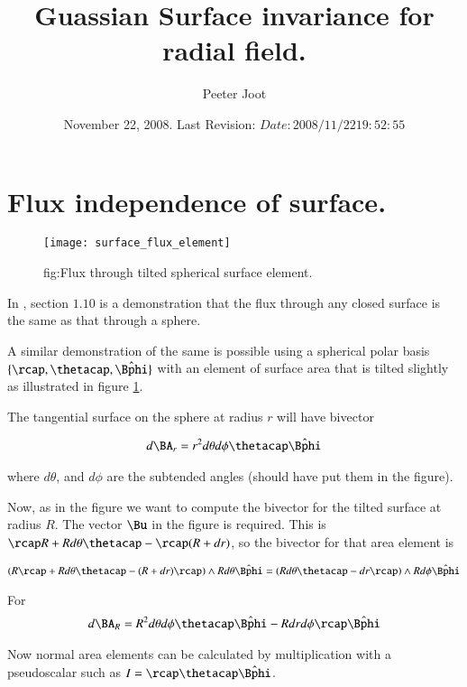 \documentclass{article}
\title{ Guassian Surface invariance for radial field. }
\author{Peeter Joot}
\date{ November 22, 2008.  Last Revision: $Date: 2008/11/22 19:52:55 $ }
\newcommand{\phicap}[0]{\hat{\Bphi}}
\begin{document}
\maketitle{}
\section{ Flux independence of surface. }

\begin{figure}[htp]
\centering
\texttt{[image: surface\_flux\_element]}
\caption{fig:Flux through tilted spherical surface element.}
\label{fig:surface_flux_element}
\end{figure}

In \cite{purcell1963eam}, section $1.10$ is a demonstration that the flux
through any closed surface is the same as that through a sphere.

A similar demonstration of the same is possible using a spherical polar basis
$\{\rcap, \thetacap, \phicap\}$ with an element of surface area that is
tilted slightly as illustrated in figure \ref{fig:surface_flux_element}.

The tangential surface on the sphere at radius $r$ will have bivector

\begin{align}
d\BA_r = r^2 d\theta d\phi \thetacap\phicap
\end{align}

where $d\theta$, and $d\phi$ are the subtended angles (should have put them in the figure).

Now, as in the figure we want to compute the bivector for the tilted surface at radius $R$.  The vector $\Bu$ in the figure is required.
This is $\rcap R + R d\theta \thetacap - \rcap(R + dr)$, so the bivector for that area element is

\begin{align*}
\left(R \rcap + R d\theta \thetacap - (R + dr) \rcap \right) \wedge {R d\theta \phicap} 
&= \left(R d\theta \thetacap - dr \rcap \right) \wedge {R d\phi \phicap} \\
\end{align*}

For
\begin{align}
d\BA_R = R^2 d\theta d\phi \thetacap \phicap - R dr d\phi \rcap \phicap
\end{align}

Now normal area elements can be calculated by multiplication with a  pseudoscalar such as $I = \rcap \thetacap \phicap$.
\end{document}
